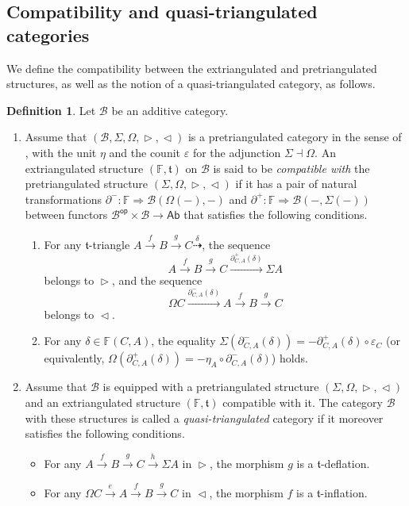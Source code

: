 \documentclass[a4paper,reqno,10pt]{amsart}
\theoremstyle{definition}
\newtheorem{definition}[definition]{Definition}
\theoremstyle{definition}
\theoremstyle{definition}
\theoremstyle{definition}
\theoremstyle{plain}
\def\Ab{\mathsf{Ab}}
\newcommand{\op}{\mathsf{op}}
\newcommand{\ft}{\mathfrak{t}}
\newcommand{\BF}{\mathbb{F}}
\newcommand{\CB}{\mathcal{B}}
\begin{document}
\subsection{Compatibility and quasi-triangulated categories}
We define the compatibility between the extriangulated and pretriangulated structures, as well as the notion of a quasi-triangulated category, as follows.
\begin{definition}\label{def:compatible_ET_PT}
Let $\CB$ be an additive category.
\begin{enumerate}
\item Assume that $(\CB,\Sigma,\Omega,\vartriangleright,\vartriangleleft)$ is a pretriangulated category in the sense of \cite{BR07}, with the unit $\eta$ and the counit $\varepsilon$ for the adjunction $\Sigma\dashv\Omega$.
An extriangulated structure $(\BF,\ft)$ on $\CB$ is said to be \emph{compatible with} the pretriangulated structure $(\Sigma,\Omega,\vartriangleright,\vartriangleleft)$ if it has a pair of natural transformations $\partial^-\colon\BF\Rightarrow\CB(\Omega(-),-)$ and $\partial^+\colon\BF\Rightarrow\CB(-,\Sigma(-))$ between functors $\CB^\op\times \CB\to\Ab$ that satisfies the following conditions.
\begin{enumerate}
    \item  For any $\ft$-triangle $A\xrightarrow{f}B\xrightarrow{g}C\overset{\delta}{\dashrightarrow}$, the sequence
\[
A\xrightarrow{f}B\xrightarrow{g}C\xrightarrow{\partial^+_{C,A}(\delta)}\Sigma A
\]
belongs to $\vartriangleright$, and the sequence
\[
\Omega C\xrightarrow{\partial^-_{C,A}(\delta)}A\xrightarrow{f}B\xrightarrow{g}C
\]
belongs to $\vartriangleleft$.
    \item {\color{blue}For any $\delta\in \BF(C,A)$, the equality $\Sigma(\partial^-_{C,A}(\delta))=-\partial^+_{C,A}(\delta)\circ\varepsilon_C$ (or equivalently, $\Omega(\partial^+_{C,A}(\delta))=-\eta_A\circ \partial^-_{C,A}(\delta)$) holds.}
\end{enumerate}
\item Assume that $\CB$ is equipped with a pretriangulated structure $(\Sigma,\Omega,\vartriangleright,\vartriangleleft)$ and an extriangulated structure $(\BF,\ft)$ compatible with it. The category $\CB$ with these structures is called a \emph{quasi-triangulated} category if it moreover satisfies the following conditions.
\begin{itemize}
\item For any $A\xrightarrow{f}B\xrightarrow{g}C\xrightarrow{h}\Sigma A
$ in $\vartriangleright$, the morphism $g$ is a $\ft$-deflation.
\item For any $\Omega C\xrightarrow{e}A\xrightarrow{f}B\xrightarrow{g}C$ in $\vartriangleleft$, the morphism $f$ is a $\ft$-inflation.
\end{itemize}
\end{enumerate}
\end{definition}
\end{document}
